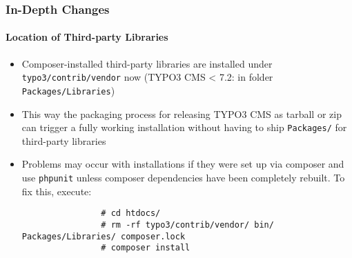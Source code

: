 \begin{frame}[fragile]
	\frametitle{In-Depth Changes}
	\framesubtitle{Location of Third-party Libraries}

	\begin{itemize}

		\item Composer-installed third-party libraries are installed under \texttt{typo3/contrib/vendor} now\newline
			\small
				(TYPO3 CMS < 7.2: in folder \texttt{Packages/Libraries})
			\normalsize

		\item This way the packaging process for releasing TYPO3 CMS as tarball or zip can trigger
			a fully working installation without having to ship \texttt{Packages/} for third-party libraries

		\item Problems may occur with installations if they were set up via composer and use \texttt{phpunit}
			unless composer dependencies have been completely rebuilt. To fix this, execute:

			\begin{lstlisting}
				# cd htdocs/
				# rm -rf typo3/contrib/vendor/ bin/ Packages/Libraries/ composer.lock
				# composer install
			\end{lstlisting}
	\end{itemize}

\end{frame}

